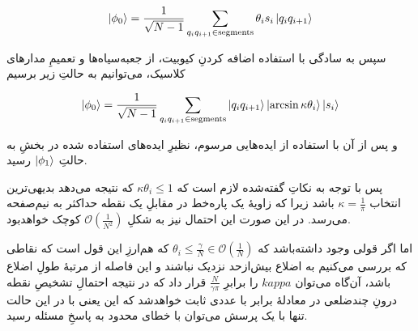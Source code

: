 \documentclass[a4paper,12pt]{article}
\renewcommand{\O}[1]{\mathcal{O}(#1)}
\begin{document}
\begin{equation}
    \ket{\phi_0} = \frac{1}{\sqrt{N-1}} \sum_{q_iq_{i+1} \in \mathrm{segments}} \theta_i s_i \ket{q_i q_{i+1}}
\end{equation}

سپس به سادگی با استفاده اضافه کردنِ کیوبیت، از جعبه‌سیاه‌ها و تعمیمِ مدارهای کلاسیک، می‌توانیم به حالتِ زیر برسیم

\begin{equation}
    \ket{\phi_0} = \frac{1}{\sqrt{N-1}} \sum_{q_iq_{i+1} \in \mathrm{segments}} \ket{q_i q_{i+1}}\ket{\arcsin{\kappa\theta_i}}\ket{s_i}
\end{equation}

و پس از آن با استفاده از ایده‌هایی مرسوم، نظیرِ ایده‌های استفاده شده در بخشِ  به حالتِ $\ket{\phi_1}$ رسید.

پس با توجه به نکاتِ گفته‌شده لازم است که
$\kappa \theta_i \le 1$
که نتیجه می‌دهد بدیهی‌ترین انتخاب 
$\kappa = \frac{1}{\pi}$
باشد زیرا که زاویهٔ یک پاره‌خط در مقابلِ یک نقطه حداکثر به نیم‌صفحه می‌رسد.
در این صورت این احتمال نیز به شکلِ 
$\O{\frac{1}{N^2}}$
کوچک خواهدبود.

اما اگر قولی وجود داشته‌باشد که 
$\theta_i \le \frac{\gamma}{N} \in \O{\frac{1}{N}}$
که هم‌ارزِ این قول است که نقاطی که بررسی می‌کنیم به اضلاع بیش‌ازحد نزدیک نباشند و این فاصله از مرتبهٔ طولِ اضلاع باشد، آن‌گاه می‌توان $kappa$ را برابرِ 
$\frac{N}{\gamma \pi}$
قرار داد که در نتیجه احتمالِ تشخیصِ نقطه درونِ چندضلعی در معادلهٔ  برابر با عددی ثابت خواهدشد که این یعنی با در این حالت تنها با یک پرسش می‌توان با خطای محدود به پاسخِ مسئله رسید.
\end{document}
